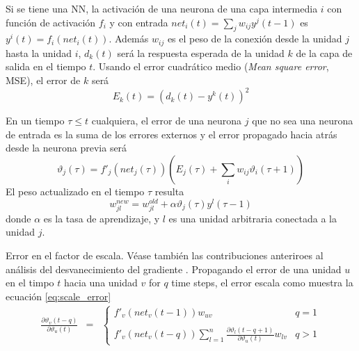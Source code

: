 Si se tiene una NN, la activación de una neurona de una capa intermedia $i$ con función de activación $f_i$ y con entrada $net_{i}(t) = \sum_{j}w_{ij}y^{j}(t - 1)$ es $y^{i}(t) = f_{i}(net_{i}(t))$. Además $w_{ij}$ es el peso de la conexión desde la unidad $j$ hasta la unidad $i$, $d_{k}(t)$ será la respuesta esperada de la unidad $k$ de la capa de salida en el tiempo $t$. Usando el error cuadrático medio ({\em Mean square error}, MSE), el error de $k$ será $$ E_{k}(t) = (d_{k}(t) - y^{k}(t))^2 $$

En un tiempo $\tau \leq t$ cualquiera, el error de una neurona $j$ que no sea una neurona de entrada es la suma de los errores externos y el error propagado hacia atrás desde la neurona previa será $$ \vartheta_{j}(\tau) = f'_{j}(net_{j}(\tau))\left(E_{j}(\tau) + \sum_{i} w_{ij}\vartheta_{i}(\tau + 1)\right) $$ El peso actualizado en el tiempo $\tau$ resulta $$ w_{jl}^{new} = w_{jl}^{old} + \alpha\vartheta_{j}(\tau) y^{l}(\tau - 1)$$
donde $\alpha$ es la tasa de aprendizaje, y $l$ es una unidad arbitraria conectada a la unidad $j$.

Error en el factor de escala. Véase también las contribuciones anteriroes al análisis del desvanecimiento del gradiente \cite{Hochreiter1997a, Bengio1994, Hochreiter1991}. Propagando el error de una unidad $u$ en el timpo $t$ hacia una unidad $v$ {\Huge for $q$ time steps}, el error escala como muestra la ecuación \ref{eq:scale_error}
\begin{eqnarray}
	\frac{\partial \vartheta_{v}(t - q)}{\partial \vartheta_{u}(t)}
	&=&
	\left\{
	\begin{array}{lr}
		f'_{v}(net_{v}(t - 1))w_{uv}&q=1\\
		\\
		f'_{v}(net_{v}(t - q))\sum^{n}_{l = 1}\frac{\partial \vartheta_{l}(t - q + 1)}{\partial \vartheta_{u}(t)}w_{lv}	&q > 1
	\end{array}
	\right.\label{eq:scale_error}
\end{eqnarray}
